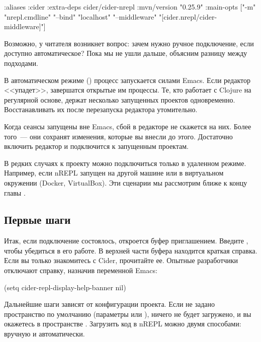 \begin{english}
  \begin{clojure}
{:aliases
 {:cider
  {:extra-deps
   {cider/cider-nrepl {:mvn/version "0.25.9"}}
   :main-opts
   ["-m" "nrepl.cmdline"
    "--bind" "localhost"
    "--middleware" "[cider.nrepl/cider-middleware]"]}}}
  \end{clojure}
\end{english}

Возможно, у читателя возникнет вопрос: зачем нужно ручное подключение, если доступно автоматическое? Пока мы не ушли дальше, объясним разницу между подходами.

В автоматическом режиме () процесс  запускается силами Emacs. Если редактор <<упадет>>, завершатся открытые им процессы. Те, кто работает с Clojure на регулярной основе, держат несколько запущенных проектов одновременно. Восстанавливать их после перезапуска редактора утомительно.

Когда сеансы запущены вне Emacs, сбой в редакторе не скажется на них. Более того~--- они сохранят изменения, которые вы внесли до этого. Достаточно включить редактор и подключится к запущенным проектам.

В редких случаях к проекту можно подключиться только в удаленном режиме. Например, если nREPL запущен на другой машине или в виртуальном окружении (Docker, VirtualBox). Эти сценарии мы рассмотрим ближе к концу главы .

\subsection{Первые шаги}

Итак, если подключение состоялось, откроется буфер  приглашением. Введите , чтобы убедиться в его работе. В верхней части буфера находится краткая справка. Если вы только знакомитесь с Cider, прочитайте ее. Опытные разработчики отключают справку, назначив  переменной Emacs:

\begin{english}
  \begin{lisp}
(setq cider-repl-display-help-banner nil)
  \end{lisp}
\end{english}

Дальнейшие шаги зависят от конфигурации проекта. Если не задано пространство по умолчанию (параметры  или  \arr {}), ничего не будет загружено, и вы окажетесь в пространстве . Загрузить код в nREPL можно двумя способами: вручную и автоматически.

